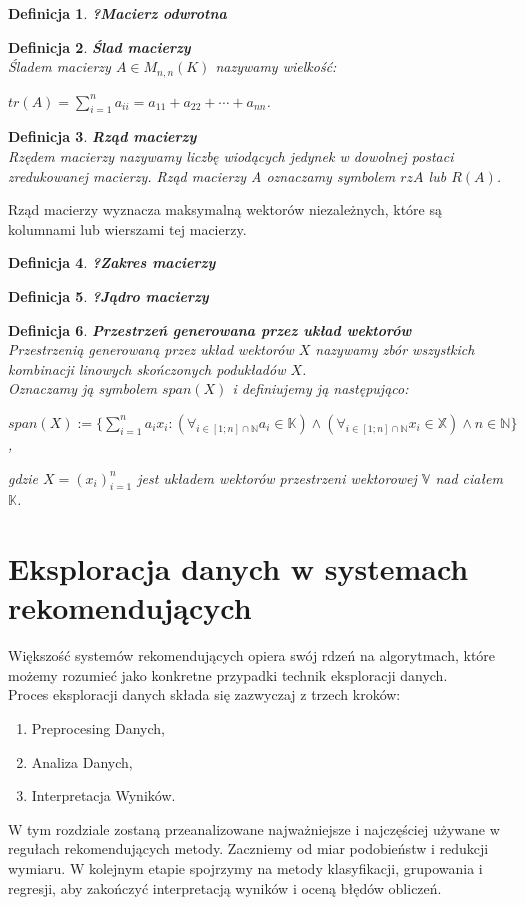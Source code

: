 \documentclass[12pt,a4paper]{report}
\newtheorem{df}{Definicja}
\begin{document}
\begin{df}\textbf{?Macierz odwrotna}
\end{df}

\begin{df}\textbf{Ślad macierzy}
\\Śladem macierzy  $A\in M_{n,n}(K)$ nazywamy wielkość:
\begin{center}
$tr(A) = \sum_{i=1}^n a_{ii} = a_{11} + a_{22} + \cdots + a_{nn}$.
\end{center}
\end{df}
\begin{df}\textbf{Rząd macierzy}%
\\Rzędem macierzy nazywamy liczbę wiodących jedynek w dowolnej postaci zredukowanej macierzy. Rząd macierzy A oznaczamy symbolem $rz A$ lub $R(A)$.
\end{df}
Rząd macierzy wyznacza maksymalną wektorów niezależnych, które są kolumnami lub wierszami tej macierzy.
\begin{df}\textbf{?Zakres macierzy}
\end{df}
\begin{df}\textbf{?Jądro macierzy}
\end{df}
\begin{df}\textbf{Przestrzeń generowana przez układ wektorów}
\\Przestrzenią generowaną przez układ wektorów $X$ nazywamy zbór wszystkich kombinacji linowych skończonych podukładów $X$.
\\Oznaczamy ją symbolem $span(X)$ i definiujemy ją następująco:
\begin{center}
$span(X) := \{\sum_{i=1}^n a_i x_i : (\forall_{i\in [1;n]\cap \mathbb{N}} a_i \in \mathbb{K}) \wedge (\forall_{i\in [1;n]\cap \mathbb{N}} x_i \in \mathbb{X}) \wedge n \in \mathbb{N}\}$,
\end{center}
gdzie $X = (x_i)_{i=1}^n$ jest układem wektorów przestrzeni wektorowej $\mathbb{V}$ nad ciałem $\mathbb{K}$.
\end{df}

\chapter{Eksploracja danych w systemach rekomendujących}
Większość systemów rekomendujących opiera swój rdzeń na algorytmach, które możemy rozumieć jako konkretne przypadki technik eksploracji danych. 
\\Proces eksploracji danych składa się zazwyczaj z trzech kroków:
\begin{enumerate}
\item Preprocesing Danych,
\item Analiza Danych,
\item Interpretacja Wyników.
\end{enumerate}
W tym rozdziale zostaną przeanalizowane najważniejsze i najczęściej używane w regułach rekomendujących metody. Zaczniemy od miar podobieństw i redukcji wymiaru. W kolejnym etapie spojrzymy na metody klasyfikacji, grupowania i regresji, aby zakończyć interpretacją wyników i oceną błędów obliczeń.
\end{document}
